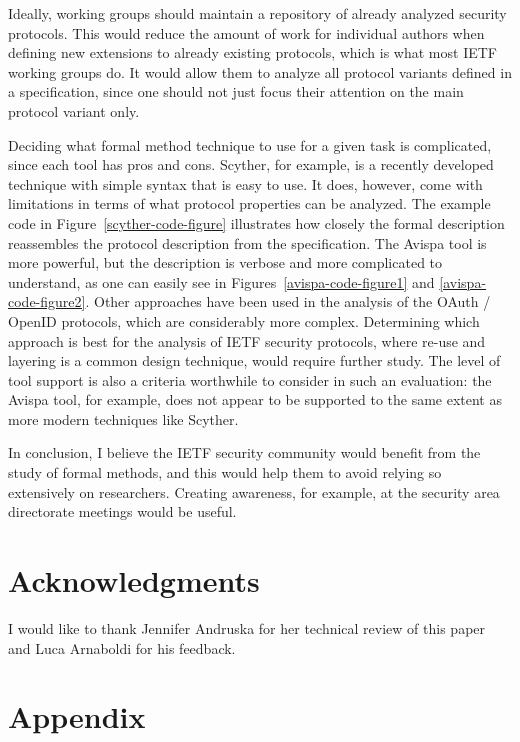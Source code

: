 \documentclass[peerreview, a4paper, 7pt]{IEEEtran}
\begin{document}
Ideally, working groups should maintain a repository of already analyzed security protocols. This would reduce the amount of work for individual authors when defining new extensions to already existing protocols, which is what most IETF working groups do. It would allow them to analyze all protocol variants defined in a specification, since one should not just focus their attention on the main protocol variant only.

Deciding what formal method technique to use for a given task is complicated, since each tool has pros and cons. Scyther, for example, is a recently developed technique with simple syntax that is easy to use. It does, however, come with limitations in terms of what protocol properties can be analyzed. The example code in Figure~\ref{scyther-code-figure} illustrates how closely the formal description reassembles the protocol description from the specification. The Avispa tool is more powerful, but the description is verbose and more complicated to understand, as one can easily see in Figures~\ref{avispa-code-figure1} and \ref{avispa-code-figure2}. Other approaches have been used in the analysis of the OAuth / OpenID protocols, which are considerably more complex. Determining which approach is best for the analysis of IETF security protocols, where re-use and layering is a common design technique, would require further study. The level of tool support is also a criteria worthwhile to consider in such an evaluation: the Avispa tool, for example, does not appear to be supported to the same extent as more modern techniques like Scyther.


In conclusion, I believe the IETF security community would benefit from the study of formal methods, and this would help them to avoid relying so extensively on researchers. Creating awareness, for example, at the security area directorate meetings would be useful. 

\section{Acknowledgments}
I would like to thank Jennifer Andruska for her technical review of this paper and Luca Arnaboldi for his feedback. 
 

% 


\appendix
\section{Appendix}
\end{document}
